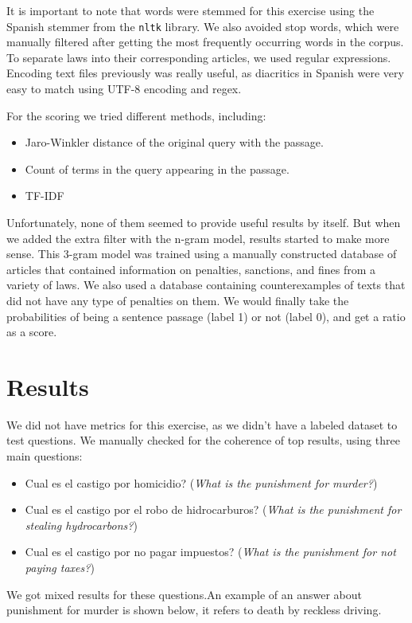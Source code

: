 \documentclass[letterpaper, margin=1in]{article}
\begin{document}
It is important to note that words were stemmed for this exercise using the Spanish stemmer from the  \texttt{nltk} library. We also avoided stop words, which were manually filtered after getting the most frequently occurring words in the corpus. To separate laws into their corresponding articles, we used regular expressions. Encoding text files previously was really useful, as diacritics in Spanish were very easy to match using UTF-8 encoding and regex. 

For the scoring we tried different methods, including:

\begin{itemize}
\item Jaro-Winkler distance of the original query with the passage.
\item Count of terms in the query appearing in the passage.
\item TF-IDF
\end{itemize}

Unfortunately, none of them seemed to provide useful results by itself. But when we added the extra filter with the n-gram model, results started to make more sense. This 3-gram model was trained using a manually constructed database of articles that contained information on penalties, sanctions, and fines from a variety of laws. We also used a database containing counterexamples of texts that did not have any type of penalties on them. We would finally take the probabilities of being a sentence passage (label 1) or not (label 0), and get a ratio as a score. 

\section{Results}
We did not have metrics for this exercise, as we didn't have a labeled dataset to test questions. We manually checked for the coherence of top results, using three main questions:
\begin{itemize}
\item Cual es el castigo por homicidio? (\textit{What is the punishment for murder?})
\item Cual es el castigo por el robo de hidrocarburos? (\textit{What is the punishment for stealing hydrocarbons?})
\item Cual es el castigo por no pagar impuestos? (\textit{What is the punishment for not paying taxes?})
\end{itemize}


We got mixed results for these questions.An example of an answer about punishment for murder is shown below, it refers to death by reckless driving. 
\end{document}
